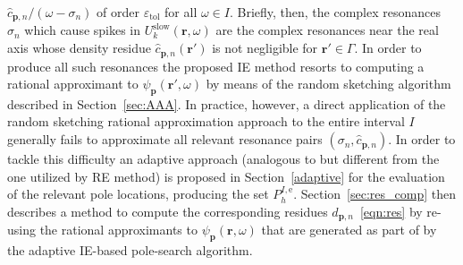 \documentclass[11pt]{article}
\theoremstyle{plain}
\theoremstyle{remark}
\def \br{\mathbf{r}}
\def \bp{\mathbf{p}}
\begin{document}
$\widehat{c}_{\bp,n}/(\omega - \sigma_n)$ of order
$\varepsilon_\mathrm{tol}$ for all $\omega \in I$.  Briefly, then, the
complex resonances $\sigma_n$ which cause spikes in
$U_k^\mathrm{slow}(\br,\omega)$ are the complex resonances near the
real axis whose density residue $\widehat{c}_{\bp,n}(\br')$ is not
negligible for $\br' \in \Gamma$. In order to produce all such
resonances the proposed IE method resorts to computing a rational
approximant to $\psi_\bp(\br',\omega)$ by means of the random
sketching algorithm described in Section~\ref{sec:AAA}. In practice,
however, a direct application of the random sketching
rational approximation approach to the
entire interval $I$ generally fails to approximate all relevant
resonance pairs $(\sigma_n, \widehat{c}_{\bp,n})$. In order to tackle
this difficulty an adaptive approach (analogous to but different from
the one utilized by RE method) is proposed in Section~\ref{adaptive}
for the evaluation of the relevant pole locations, producing the set
$P^{I,\mathrm{e}}_h$.  Section~\ref{sec:res_comp} then describes a
method to compute the corresponding residues
$d_{\bp, n}$~\eqref{eqn:res} by re-using the rational approximants to
$\psi_\bp(\br,\omega)$ that are generated as part of by the adaptive
IE-based pole-search algorithm.

\vspace{0.2cm}
\begin{algorithm}[H]
    \DontPrintSemicolon 
\caption{Adaptive Incidence-Excitation Resonance Evaluation} \label{alg:real-line-adaptive}
\end{algorithm}
\vspace{0.2cm}
\end{document}
